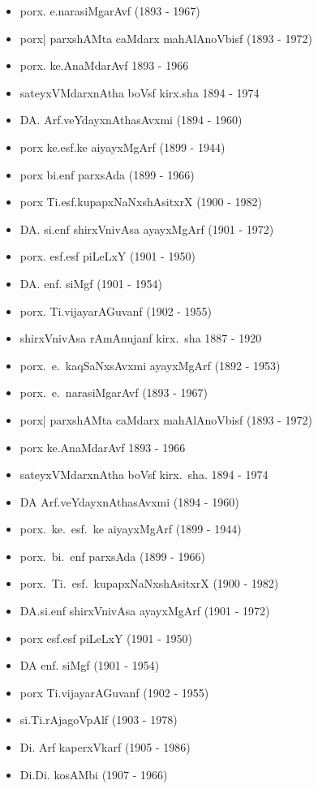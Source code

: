 {\begin{itemize}
\item porx. e.narasiMgarAvf {\rm (1893 - 1967)}
\item porx| parxshAMta caMdarx mahAlAnoVbisf {\rm (1893 - 1972)}
\item porx. ke.AnaMdarAvf {\rm 1893 - 1966}
\item sateyxVMdarxnAtha boVsf kirx.sha {\rm 1894 - 1974}
\item DA. Arf.veYdayxnAthasAvxmi {\rm (1894 - 1960)}
\item porx ke.esf.ke aiyayxMgArf {\rm (1899 - 1944)}
\item porx bi.enf parxsAda {\rm (1899 - 1966)}
\item porx Ti.esf.kupapxNaNxshAsitxrX {\rm (1900 - 1982)}
\item DA. si.enf shirxVnivAsa ayayxMgArf {\rm (1901 - 1972)}
\item porx. esf.esf piLeLxY {\rm (1901 - 1950)}
\item DA. enf. siMgf {\rm (1901 - 1954)}
\item porx. Ti.vijayarAGuvanf {\rm (1902 - 1955)}
\item shirxVnivAsa rAmAnujanf kirx.~sha {\rm 1887 - 1920}
\item porx.~e.~kaqSaNxsAvxmi ayayxMgArf {\rm (1892 - 1953)}
\item porx.~e.~narasiMgarAvf {\rm (1893 - 1967)}
\item porx| parxshAMta caMdarx mahAlAnoVbisf {\rm (1893 - 1972)}
\item porx ke.AnaMdarAvf {\rm 1893 - 1966}
\item sateyxVMdarxnAtha boVsf kirx.~sha. {\rm 1894 - 1974}
\item DA Arf.veYdayxnAthasAvxmi {\rm (1894 - 1960)}
\item porx.~ke.~esf.~ke aiyayxMgArf {\rm (1899 - 1944)}
\item porx.~bi.~enf parxsAda {\rm (1899 - 1966)}
\item porx.~Ti.~esf.~kupapxNaNxshAsitxrX {\rm (1900 - 1982)}
\item DA.si.enf shirxVnivAsa ayayxMgArf {\rm (1901 - 1972)}
\item porx esf.esf piLeLxY {\rm (1901 - 1950)}
\item DA enf. siMgf {\rm (1901 - 1954)}
\item porx Ti.vijayarAGuvanf {\rm (1902 - 1955)}
\item si.Ti.rAjagoVpAlf {\rm (1903 - 1978)}
\item Di. Arf kaperxVkarf {\rm (1905 - 1986)}
\item Di.Di. kosAMbi {\rm (1907 - 1966)}

\end{itemize}}
